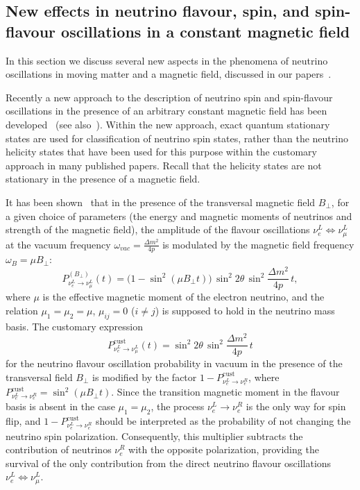 \documentclass[a4paper,11pt]{article}
\begin{document}

\subsection{New effects in neutrino flavour, spin, and spin-flavour oscillations in a constant magnetic field}

In this section we discuss several new aspects in the phenomena of neutrino oscillations in moving matter and a magnetic field, discussed in our papers~\cite{Studenikin:2004PAN,Pustoshny:Studenikin:2018PRD,Popov:Studenikin:2019EPJC,Studenikin:2019arXiv,Popov:Studenikin:2021PRD}.

Recently a new approach to the description of neutrino spin and spin-flavour oscillations in the presence of an arbitrary constant magnetic field has been developed~\cite{Popov:Studenikin:2019EPJC} (see also~\cite{Studenikin:2019arXiv}). Within the new approach, exact quantum stationary states are used for classification of neutrino spin states, rather than the neutrino helicity states that have been used for this purpose within the customary approach in many published papers. Recall that the helicity states are not stationary in the presence of a magnetic field.

It has been shown~\cite{Popov:Studenikin:2019EPJC} that in the presence of the transversal magnetic field $B_\perp$, for a given choice of parameters (the energy and magnetic moments of neutrinos and strength of the magnetic field), the amplitude of the flavour oscillations $\nu_e^L \Leftrightarrow \nu_\mu^L$ at the vacuum frequency $\omega_{vac} = \frac{\Delta m^2}{4p}$ is modulated by the magnetic field frequency $\omega_B = \mu B_\perp$:
\begin{equation}
\label{eq:P_flavour_B}
P_{\nu_e^L \to \nu_\mu^L}^{(B_\perp)}(t) = \Big(1 - \sin^2(\mu B_\perp t)\Big)\,\sin^2 2\theta\,\sin^2\frac{\Delta m^2}{4p}\,t,
\end{equation}
where $\mu$ is the effective magnetic moment of the electron neutrino, and the relation $\mu_1 = \mu_2 = \mu$, $\mu_{ij} = 0$ ($i \neq j$) is supposed to hold in the neutrino mass basis. The customary expression
\begin{equation}
P_{\nu_e^L \to \nu_\mu^L}^{\text{cust}}(t) = \sin^2 2\theta\,\sin^2\frac{\Delta m^2}{4p}\,t
\end{equation}
for the neutrino flavour oscillation probability in vacuum in the presence of the transversal field $B_\perp$ is modified by the factor $1 - P_{\nu_e^L \to \nu_e^R}^{\text{cust}}$, where $P_{\nu_e^L \to \nu_e^R}^{\text{cust}} = \sin^2(\mu B_\perp t)$. Since the transition magnetic moment in the flavour basis is absent in the case $\mu_1 = \mu_2$, the process $\nu_e^L \to \nu_e^R$ is the only way for spin flip, and $1 - P_{\nu_e^L \to \nu_e^R}^{\text{cust}}$ should be interpreted as the probability of not changing the neutrino spin polarization. Consequently, this multiplier subtracts the contribution of neutrinos $\nu_e^R$ with the opposite polarization, providing the survival of the only contribution from the direct neutrino flavour oscillations $\nu_e^L \Leftrightarrow \nu_\mu^L$.
\end{document}
